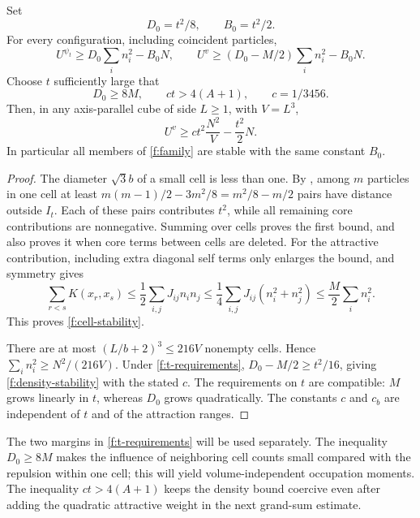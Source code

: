 \begin{proposition}\label{f:stability}
Set
\begin{equation}\label{f:stability-constants}
 D_0=t^2/8,\qquad B_0=t^2/2.
\end{equation}
For every configuration, including coincident particles,
\begin{equation}\label{f:cell-stability}
 U^{\psi_t}\ge D_0\sum_i n_i^2-B_0N,
 \qquad
 U^v\ge(D_0-M/2)\sum_i n_i^2-B_0N.
\end{equation}
Choose $t$ sufficiently large that
\begin{equation}\label{f:t-requirements}
 D_0\ge8M,\qquad ct>4(A+1),\qquad c=1/3456.
\end{equation}
Then, in any axis-parallel cube of side $L\ge1$, with $V=L^3$,
\begin{equation}\label{f:density-stability}
 U^v\ge ct^2\frac{N^2}{V}-\frac{t^2}{2}N.
\end{equation}
In particular all members of \eqref{f:family} are stable with the
same constant $B_0$.
\end{proposition}

\begin{proof}
The diameter $\sqrt3 b$ of a small cell is less than one.  By
, among $m$ particles in one cell at least
$m(m-1)/2-3m^2/8=m^2/8-m/2$ pairs have distance outside $I_t$.
Each of these pairs contributes $t^2$, while all remaining core
contributions are nonnegative.  Summing over cells proves the first
bound, and also proves it when core terms between cells are deleted.
For the attractive contribution, including extra diagonal self terms
only enlarges the bound, and symmetry gives
\[
 \sum_{r<s}K(x_r,x_s)
 \le\frac12\sum_{i,j}J_{ij}n_i n_j
 \le\frac14\sum_{i,j}J_{ij}(n_i^2+n_j^2)
 \le\frac M2\sum_i n_i^2.
\]
This proves \eqref{f:cell-stability}.

There are at most $(L/b+2)^3\le216V$ nonempty cells.  Hence
$\sum_i n_i^2\ge N^2/(216V)$.  Under \eqref{f:t-requirements},
$D_0-M/2\ge t^2/16$, giving \eqref{f:density-stability} with the stated
$c$.  The requirements on $t$ are compatible: $M$ grows linearly in
$t$, whereas $D_0$ grows quadratically.  The constants $c$ and $c_b$
are independent of $t$ and of the attraction ranges.
\end{proof}

The two margins in \eqref{f:t-requirements} will be used separately.
The inequality $D_0\ge8M$ makes the influence of neighboring cell counts
small compared with the repulsion within one cell; this will yield
volume-independent occupation moments.  The inequality $ct>4(A+1)$
keeps the density bound coercive even after adding the quadratic
attractive weight in the next grand-sum estimate.


